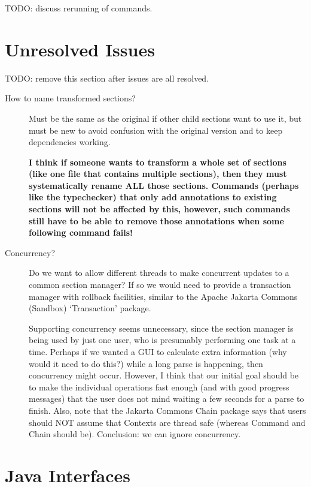 \documentclass{llncs} %
\begin{document}
TODO: discuss rerunning of commands.  


\section{Unresolved Issues}

TODO: remove this section after issues are all resolved.

\begin{description}

\item[How to name transformed sections?]  Must be the same as the
  original if other child sections want to use it, but must
  be new to avoid confusion with the original version and
  to keep dependencies working.

  \textbf{I think if someone wants to transform a whole set of
    sections (like one file that contains multiple sections), then
    they must systematically rename ALL those sections. Commands
    (perhaps like the typechecker) that only add annotations to
    existing sections will not be affected by this, however, such
    commands still have to be able to remove those annotations
    when some following command fails!}

\item[Concurrency?]  Do we want to allow different threads to
  make concurrent updates to a common section manager?  If so
  we would need to provide a transaction manager with rollback
  facilities, similar to the Apache Jakarta Commons (Sandbox) `Transaction'
  package.  
  
  Supporting concurrency seems unnecessary, since the section manager is
  being used by just one user, who is presumably performing one task at a
  time.  Perhaps if we wanted a GUI to calculate extra information (why
  would it need to do this?) while a long parse is happening, then
  concurrency might occur.  However, I think that our initial goal should
  be to make the individual operations fast enough (and with good progress
  messages) that the user does not mind waiting a few seconds for a parse
  to finish.  Also, note that the Jakarta Commons Chain package says
  that users should NOT assume that Contexts are thread safe (whereas
  Command and Chain should be).  Conclusion: we can ignore concurrency.
\end{description}


\section{Java Interfaces}
\end{document}
